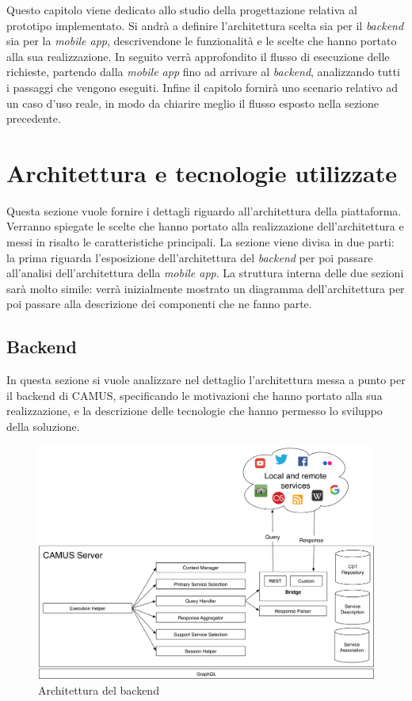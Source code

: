 Questo capitolo viene dedicato allo studio della progettazione relativa al prototipo implementato. Si andrà a definire l'architettura scelta sia per il \emph{backend} sia per la \emph{mobile app}, descrivendone le funzionalità e le scelte che hanno portato alla sua realizzazione. In seguito verrà approfondito il flusso di esecuzione delle richieste, partendo dalla \emph{mobile app} fino ad arrivare al \emph{backend}, analizzando tutti i passaggi che vengono eseguiti. Infine il capitolo fornirà uno scenario relativo ad un caso d'uso reale, in modo da chiarire meglio il flusso esposto nella sezione precedente.

\section{Architettura e tecnologie utilizzate}

Questa sezione vuole fornire i dettagli riguardo all'architettura della piattaforma. Verranno spiegate le scelte che hanno portato alla realizzazione dell'architettura e messi in risalto le caratteristiche principali. La sezione viene divisa in due parti: la prima riguarda l'esposizione dell'architettura del \emph{backend} per poi passare all'analisi dell'architettura della \emph{mobile app}. La struttura interna delle due sezioni sarà molto simile: verrà inizialmente mostrato un diagramma dell'architettura per poi passare alla descrizione dei componenti che ne fanno parte. 

\subsection{Backend\label{sec:architettura-backend}}

In questa sezione si vuole analizzare nel dettaglio l'architettura messa a punto per il backend di CAMUS, specificando le motivazioni che hanno portato alla sua realizzazione, e la descrizione delle tecnologie che hanno permesso lo sviluppo della soluzione.

\begin{figure}[ht]
	\centering
	\includegraphics[width=\textwidth]{4-progettazione-alto-livello/Immagini/camus-architecture-backend.png}
	\caption{Architettura del backend}\label{fig:architettura-backend}
\end{figure}

